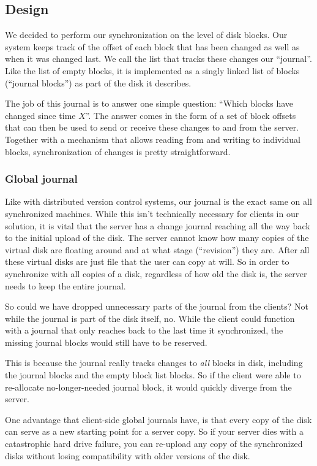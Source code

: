 \documentclass[a4paper,12pt]{article}
\begin{document}
\subsection{Design}
We decided to perform our synchronization on the level of disk blocks.
Our system keeps track of the offset of each block that has been changed as well as when it was changed last.
We call the list that tracks these changes our ``journal''.
Like the list of empty blocks, it is implemented as a singly linked list of blocks (``journal blocks'') as part of the disk it describes.

The job of this journal is to answer one simple question: ``Which blocks have changed since time $X$''.
The answer comes in the form of a set of block offsets that can then be used to send or receive these changes to and from the server. 
Together with a mechanism that allows reading from and writing to individual blocks, synchronization of changes is pretty straightforward.

\subsubsection{Global journal}
Like with distributed version control systems, our journal is the exact same on all synchronized machines.
While this isn't technically necessary for clients in our solution, it is vital that the server has a change journal reaching all the way back to the initial upload of the disk.
The server cannot know how many copies of the virtual disk are floating around and at what stage (``revision'') they are.
After all these virtual disks are just file that the user can copy at will.
So in order to synchronize with all copies of a disk, regardless of how old the disk is, the server needs to keep the entire journal.

So could we have dropped unnecessary parts of the journal from the clients? 
Not while the journal is part of the disk itself, no.
While the client could function with a journal that only reaches back to the last time it synchronized, the missing journal blocks would still have to be reserved.

This is because the journal really tracks changes to \emph{all} blocks in disk, including the journal blocks and the empty block list blocks. 
So if the client were able to re-allocate no-longer-needed journal block, it would quickly diverge from the server.

One advantage that client-side global journals have, is that every copy of the disk can serve as a new starting point for a server copy.
So if your server dies with a catastrophic hard drive failure, you can re-upload any copy of the synchronized disks without losing compatibility with older versions of the disk.
\end{document}
